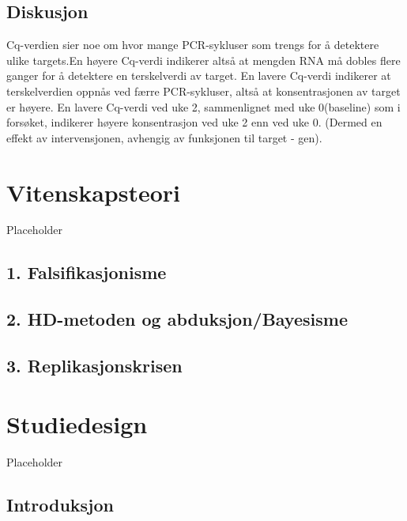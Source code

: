 \documentclass[
]{book}
\begin{document}
\hypertarget{diskusjon-1}{%
\section{Diskusjon}\label{diskusjon-1}}

Cq-verdien sier noe om hvor mange PCR-sykluser som trengs for å detektere ulike targets.En høyere Cq-verdi indikerer altså at mengden RNA må dobles flere ganger for å detektere en terskelverdi av target. En lavere Cq-verdi indikerer at terskelverdien oppnås ved færre PCR-sykluser, altså at konsentrasjonen av target er høyere. En lavere Cq-verdi ved uke 2, sammenlignet med uke 0(baseline) som i forsøket, indikerer høyere konsentrasjon ved uke 2 enn ved uke 0. (Dermed en effekt av intervensjonen, avhengig av funksjonen til target - gen).

\hypertarget{vitenskapsteori}{%
\chapter{Vitenskapsteori}\label{vitenskapsteori}}

Placeholder

\hypertarget{falsifikasjonisme}{%
\section{1. Falsifikasjonisme}\label{falsifikasjonisme}}

\hypertarget{hd-metoden-og-abduksjonbayesisme}{%
\section{2. HD-metoden og abduksjon/Bayesisme}\label{hd-metoden-og-abduksjonbayesisme}}

\hypertarget{replikasjonskrisen}{%
\section{3. Replikasjonskrisen}\label{replikasjonskrisen}}

\hypertarget{studiedesign}{%
\chapter{Studiedesign}\label{studiedesign}}

Placeholder

\hypertarget{introduksjon-1}{%
\section{Introduksjon}\label{introduksjon-1}}
\end{document}
